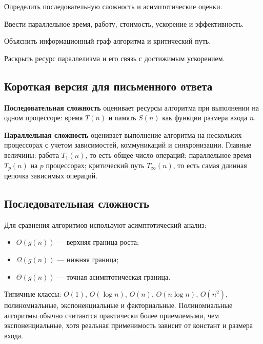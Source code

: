 
\begin{examplan}
    \item Определить последовательную сложность и асимптотические оценки.
    \item Ввести параллельное время, работу, стоимость, ускорение и эффективность.
    \item Объяснить информационный граф алгоритма и критический путь.
    \item Раскрыть ресурс параллелизма и его связь с достижимым ускорением.
\end{examplan}

\subsection*{Короткая версия для письменного ответа}

\textbf{Последовательная сложность} оценивает ресурсы алгоритма при выполнении на одном процессоре: время $T(n)$ и память $S(n)$ как функции размера входа $n$.

\textbf{Параллельная сложность} оценивает выполнение алгоритма на нескольких процессорах с учетом зависимостей, коммуникаций и синхронизации. Главные величины: работа $T_1(n)$, то есть общее число операций; параллельное время $T_p(n)$ на $p$ процессорах; критический путь $T_\infty(n)$, то есть самая длинная цепочка зависимых операций.

\subsection*{Последовательная сложность}

Для сравнения алгоритмов используют асимптотический анализ:
\begin{itemize}
    \item $O(g(n))$ --- верхняя граница роста;
    \item $\Omega(g(n))$ --- нижняя граница;
    \item $\Theta(g(n))$ --- точная асимптотическая граница.
\end{itemize}

Типичные классы: $O(1)$, $O(\log n)$, $O(n)$, $O(n\log n)$, $O(n^2)$, полиномиальные, экспоненциальные и факториальные. Полиномиальные алгоритмы обычно считаются практически более приемлемыми, чем экспоненциальные, хотя реальная применимость зависит от констант и размера входа.

